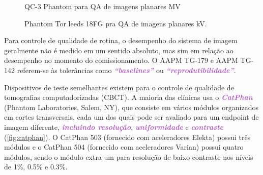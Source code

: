 \documentclass[11pt,a4paper]{article}
\begin{document}
    \begin{figure}[h]
        \centering
        \caption{QC-3 Phantom para QA de imagens planares MV}
        \label{fig:qaImagemPlanarMV}
    \end{figure}

    \begin{figure}[h]
        \centering
        \caption{Phantom Tor leeds 18FG pra QA de imagens planares kV.}
        \label{fig:torleeds}
    \end{figure}

    Para controle de qualidade de rotina, o desempenho do sistema de imagem geralmente não é medido em um sentido absoluto, mas sim em relação ao desempenho no momento do comissionamento. O AAPM TG-179 e AAPM TG-142 referem-se às tolerâncias como \textcolor{MediumOrchid}{\textbf{\textit{``baselines''}}} ou \textcolor{MediumOrchid}{\textbf{\textit{``reprodutibilidade''}}}.

    Dispositivos de teste semelhantes existem para o controle de qualidade de tomografias computadorizadas (CBCT). A maioria das clínicas usa o \textcolor{MediumOrchid}{\textbf{\textit{CatPhan}}} (Phantom Laboratories, Salem, NY), que consiste em vários módulos organizados em cortes transversais, cada um dos quais pode ser avaliado para um endpoint de imagem diferente, \textcolor{MediumOrchid}{\textbf{\textit{incluindo resolução}}}, \textcolor{MediumOrchid}{\textbf{\textit{uniformidade}}} e \textcolor{MediumOrchid}{\textbf{\textit{contraste}}} (\ref{fig:catphan}). O CatPhan 503 (fornecido com aceleradores Elekta) possui três módulos e o CatPhan 504 (fornecido com aceleradores Varian) possui quatro módulos, sendo o módulo extra um para resolução de baixo contraste nos níveis de 1\%, 0.5\% e 0.3\%.
\end{document}
